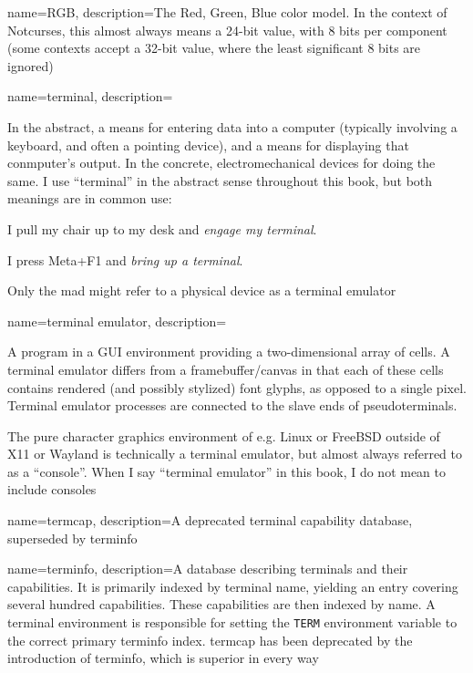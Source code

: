 {
  name={RGB},
  description={The Red, Green, Blue color model. In the context of Notcurses,
    this almost always means a 24-bit value, with 8 bits per component (some
    contexts accept a 32-bit value, where the least significant 8 bits are
    ignored)}
}

{
  name={terminal},
description={In the abstract, a means for entering data into a computer
  (typically involving a keyboard, and often a pointing device), and a means
  for displaying that conmputer's output. In the concrete, electromechanical
  devices for doing the same. I use ``terminal'' in the abstract sense
  throughout this book, but both meanings are in common use:

  \begin{denseitemize}
  \item I pull my chair up to my desk and \textit{engage my terminal}.
  \item I press Meta+F1 and \textit{bring up a terminal}.
  \end{denseitemize}

 Only the mad might refer to a physical device as a terminal emulator}
}

{
  name={terminal emulator},
description={A program in a GUI environment providing a
  two-dimensional array of cells. A terminal emulator differs from a
  framebuffer/canvas in that each of these cells contains rendered (and
  possibly stylized) font glyphs, as opposed to a single pixel. Terminal
  emulator processes are connected to the slave ends of pseudoterminals.

 The pure character graphics environment of e.g. Linux or FreeBSD outside
  of X11 or Wayland is technically a terminal emulator, but almost always
  referred to as a ``console''. When I say ``terminal emulator'' in this book,
  I do not mean to include consoles}
}

{
  name={termcap},
description={A deprecated terminal capability database, superseded by \gls{terminfo}}
}

{
  name={terminfo},
description={A database describing terminals and their capabilities. It is
  primarily indexed by terminal name, yielding an entry covering several
  hundred capabilities. These capabilities are then indexed by name. A
  terminal environment is responsible for setting the \texttt{TERM} environment
  variable to the correct primary terminfo index. termcap has been
  deprecated by the introduction of terminfo, which is superior in every way}
}

